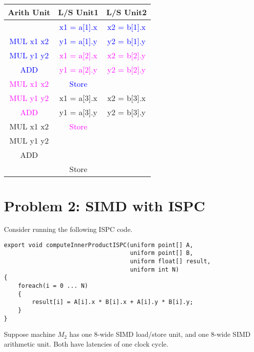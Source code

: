 \documentclass[11pt]{article}
\begin{document}
\begin{tabular} {ccc}
  \toprule
  Arith Unit & L/S Unit1 & L/S Unit2 \\
  \midrule
  & \textcolor{blue}{x1 = a[1].x} & \textcolor{blue}{x2 = b[1].x} \\
  \textcolor{blue}{MUL x1 x2} & \textcolor{blue}{y1 = a[1].y} & \textcolor{blue}{y2 = b[1].y} \\
  \textcolor{blue}{MUL y1 y2} & \textcolor{magenta}{x1 = a[2].x} & \textcolor{magenta}{x2 = b[2].y} \\
  \textcolor{blue}{ADD} & \textcolor{magenta}{y1 = a[2].y} & \textcolor{magenta}{y2 = b[2].y}\\
  \textcolor{magenta}{MUL x1 x2} & \textcolor{blue}{Store} & \\
  \textcolor{magenta}{MUL y1 y2} & x1 = a[3].x & x2 = b[3].x\\
  \textcolor{magenta}{ADD} & y1 = a[3].y & y2 = b[3].y\\
  MUL x1 x2 & \textcolor{magenta}{Store} & \\
  MUL y1 y2\\
  ADD\\
  &Store\\
  \bottomrule

\end{tabular}

\newpage
\section*{Problem 2: SIMD with ISPC}


Consider running the following ISPC code.
\begin{lstlisting}
export void computeInnerProductISPC(uniform point[] A, 
                                    uniform point[] B,
                                    uniform float[] result,
                                    uniform int N)
{
    foreach(i = 0 ... N)
    {
        result[i] = A[i].x * B[i].x + A[i].y * B[i].y;
    }
}
\end{lstlisting}

Suppose machine $M_2$ has one 8-wide SIMD load/store unit,
  and one 8-wide SIMD arithmetic unit.  Both have latencies of one clock cycle.
\end{document}
